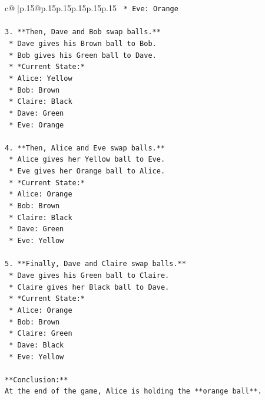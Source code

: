 \documentclass{article}
\begin{document}
{\begin{supertabular}{c@{$\;$}|p{.15\linewidth}@{}p{.15\linewidth}p{.15\linewidth}p{.15\linewidth}p{.15\linewidth}p{.15\linewidth}}
{{{\texttt{        *   Eve: Orange} \\
\\ 
\texttt{3.  **Then, Dave and Bob swap balls.**} \\
\texttt{    *   Dave gives his Brown ball to Bob.} \\
\texttt{    *   Bob gives his Green ball to Dave.} \\
\texttt{    *   *Current State:*} \\
\texttt{        *   Alice: Yellow} \\
\texttt{        *   Bob: Brown} \\
\texttt{        *   Claire: Black} \\
\texttt{        *   Dave: Green} \\
\texttt{        *   Eve: Orange} \\
\\ 
\texttt{4.  **Then, Alice and Eve swap balls.**} \\
\texttt{    *   Alice gives her Yellow ball to Eve.} \\
\texttt{    *   Eve gives her Orange ball to Alice.} \\
\texttt{    *   *Current State:*} \\
\texttt{        *   Alice: Orange} \\
\texttt{        *   Bob: Brown} \\
\texttt{        *   Claire: Black} \\
\texttt{        *   Dave: Green} \\
\texttt{        *   Eve: Yellow} \\
\\ 
\texttt{5.  **Finally, Dave and Claire swap balls.**} \\
\texttt{    *   Dave gives his Green ball to Claire.} \\
\texttt{    *   Claire gives her Black ball to Dave.} \\
\texttt{    *   *Current State:*} \\
\texttt{        *   Alice: Orange} \\
\texttt{        *   Bob: Brown} \\
\texttt{        *   Claire: Green} \\
\texttt{        *   Dave: Black} \\
\texttt{        *   Eve: Yellow} \\
\\ 
\texttt{**Conclusion:**} \\
\texttt{At the end of the game, Alice is holding the **orange ball**.} \\
}}}
\end{supertabular}}
\end{document}
